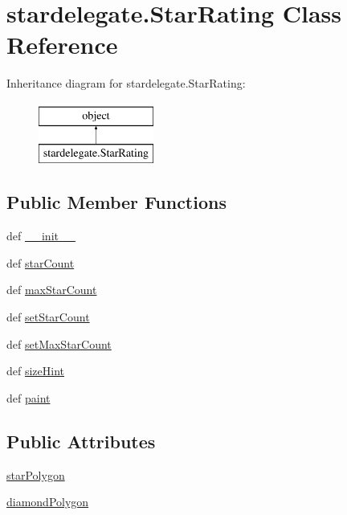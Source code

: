 \hypertarget{classstardelegate_1_1StarRating}{}\section{stardelegate.\+Star\+Rating Class Reference}
\label{classstardelegate_1_1StarRating}
Inheritance diagram for stardelegate.\+Star\+Rating\+:\begin{figure}[H]
\begin{center}
\leavevmode
\includegraphics[height=2.000000cm]{classstardelegate_1_1StarRating}
\end{center}
\end{figure}
\subsection*{Public Member Functions}
\begin{DoxyCompactItemize}
\item 
def \hyperlink{classstardelegate_1_1StarRating_ae22a40f781a892c038c15ff996e5790d}{\+\_\+\+\_\+init\+\_\+\+\_\+}
\item 
def \hyperlink{classstardelegate_1_1StarRating_aba8471472400ec1a128bb04b833e8131}{star\+Count}
\item 
def \hyperlink{classstardelegate_1_1StarRating_a23f2f652be608549e3b1747c49d8f93f}{max\+Star\+Count}
\item 
def \hyperlink{classstardelegate_1_1StarRating_a0faf78018dbdcf32a5009399fdbb29dd}{set\+Star\+Count}
\item 
def \hyperlink{classstardelegate_1_1StarRating_a8e06e9607c7a2401141b9947df70ea04}{set\+Max\+Star\+Count}
\item 
def \hyperlink{classstardelegate_1_1StarRating_ae07715a531bc81061c6b4914b7d5bcce}{size\+Hint}
\item 
def \hyperlink{classstardelegate_1_1StarRating_a38f8e3cdf6e8eb0a28f782760b115f9d}{paint}
\end{DoxyCompactItemize}
\subsection*{Public Attributes}
\begin{DoxyCompactItemize}
\item 
\hyperlink{classstardelegate_1_1StarRating_ab32e61d2e9fe0e17108a0706ee78ca2f}{star\+Polygon}
\item 
\hyperlink{classstardelegate_1_1StarRating_ad403779a38998d8f1c62680c0e493c32}{diamond\+Polygon}
\end{DoxyCompactItemize}
